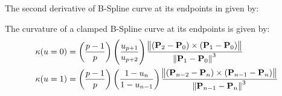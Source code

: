 \begin{enumerate}
    The second derivative of B-Spline curve at its endpoints in given by: \\

    The curvature of a clamped B-Spline curve at its endpoints is given by:
    \begin{align*}
        \kappa(u=0) &=  \left( \frac{p-1}{p}  \right)  \left( \frac{u_{p+1}}{u_{p+2}}  \right) 
        \frac{\norm{ \left(\mathbf{P}_{2}-\mathbf{P}_{0}\right) \times \left(\mathbf{P}_{1}-\mathbf{P}_{0}\right)} }{\norm{\mathbf{P}_{1}-\mathbf{P}_{0}}^3} \\
        \kappa(u=1) &=  \left( \frac{p-1}{p}  \right)  \left( \frac{1-u_{n}}{1-u_{n-1}}  \right)
        \frac{\norm{ \left(\mathbf{P}_{n-2}-\mathbf{P}_{n}\right) \times \left(\mathbf{P}_{n-1}-\mathbf{P}_{n}\right)} }{\norm{\mathbf{P}_{n-1}-\mathbf{P}_{n}}^3}
    \end{align*}

    
    


    
\end{enumerate}







